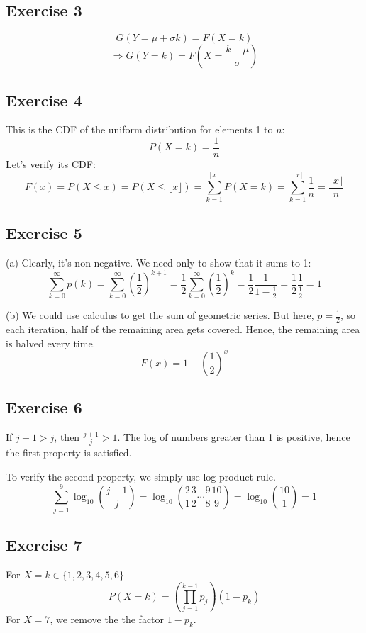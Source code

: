 \documentclass{book}
\begin{document}
\subsection*{Exercise 3}
$$G(Y = \mu + \sigma k) = F(X = k)$$
$$\Rightarrow G(Y = k) = F\left(X = \frac{k - \mu}{\sigma}\right)$$

\subsection*{Exercise 4}
This is the CDF of the uniform distribution for elements 1 to $n$:
$$P(X = k) = \frac{1}{n}$$
Let's verify its CDF:
$$F(x) = P(X \leq x) = P(X \leq \lfloor x \rfloor) = \sum_{k = 1}^{\lfloor x \rfloor} P(X = k) = \sum_{k = 1}^{\lfloor x \rfloor} \frac{1}{n} = \frac{\lfloor x \rfloor}{n}$$

\subsection*{Exercise 5}
(a) Clearly, it's non-negative. We need only to show that it sums to 1:
$$\sum_{k = 0}^\infty p(k) = \sum_{k = 0}^\infty \left(\frac{1}{2}\right)^{k + 1} = \frac{1}{2} \sum_{k = 0}^\infty \left(\frac{1}{2}\right)^{k} = \frac{1}{2} \frac{1}{1 - \frac{1}{2}} = \frac{1}{2} \frac{1}{\frac{1}{2}} = 1$$

\noindent
(b) We could use calculus to get the sum of geometric series. But here, $p = \frac{1}{2}$, so each iteration, half of the remaining area gets covered. Hence, the remaining area is halved every time.
$$F(x) = 1 - \left(\frac{1}{2}\right)^x$$

\subsection*{Exercise 6}
If $j + 1 > j$, then $\frac{j + 1}{j} > 1$. The log of numbers greater than 1 is positive, hence the first property is satisfied.

To verify the second property, we simply use log product rule.
$$\sum_{j = 1}^9 \log_{10}(\frac{j + 1}{j}) = \log_{10}(\frac{2}{1} \frac{3}{2} \cdots \frac{9}{8} \frac{10}{9}) = \log_{10}(\frac{10}{1}) = 1$$

\subsection*{Exercise 7}
For $X = k \in \{1, 2, 3, 4, 5, 6\}$
$$P(X = k) = \left( \prod_{j = 1}^{k - 1} p_j \right) (1 - p_k)$$
For $X = 7$, we remove the the factor $1 - p_k$.
\end{document}
